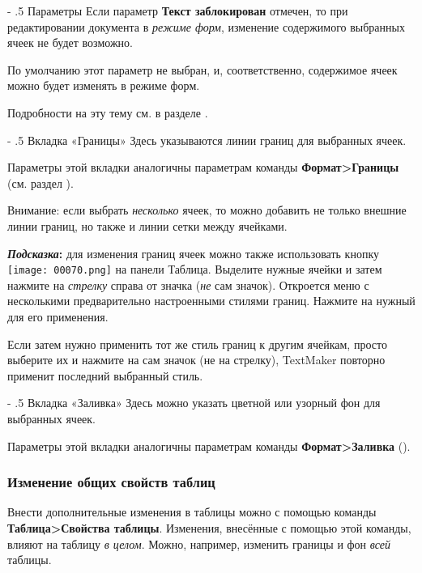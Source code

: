 ﻿\documentclass[a4paper,10pt]{article}
\makeatletter
\renewcommand\paragraph{%
   \@startsection{paragraph}{4}{0mm}%
      {-\baselineskip}%
      {.5\baselineskip}%
      {\normalfont\normalsize\bfseries}}
\makeatother
\begin{document}
\paragraph{Параметры}
Если параметр \textbf{Текст заблокирован} отмечен, то при редактировании документа в \textit{режиме форм}, изменение содержимого выбранных ячеек не будет возможно.

По умолчанию этот параметр не выбран, и, соответственно, содержимое ячеек можно будет изменять в режиме форм.

Подробности на эту тему см. в разделе .

\paragraph{Вкладка «Границы»}
Здесь указываются линии границ для выбранных ячеек.

Параметры этой вкладки аналогичны параметрам команды \textbf{Формат>Границы} (см. раздел ).

Внимание: если выбрать \textit{несколько} ячеек, то можно добавить не только внешние линии границ, но также и линии сетки между ячейками.

\begin{mdframed}[backgroundcolor=blue!10]
\textbf{\textit{Подсказка}:} для изменения границ ячеек можно также использовать кнопку \texttt{[image: 00070.png]} на панели Таблица. Выделите нужные ячейки и затем нажмите на \textit{стрелку} справа от значка (\textit{не} сам значок). Откроется меню с несколькими предварительно настроенными стилями границ. Нажмите на нужный для его применения.

Если затем нужно применить тот же стиль границ к другим ячейкам, просто выберите их и нажмите на сам значок (не на стрелку), TextMaker повторно применит последний выбранный стиль.
\end{mdframed}

\paragraph{Вкладка «Заливка»}
Здесь можно указать цветной или узорный фон для выбранных ячеек.

Параметры этой вкладки аналогичны параметрам команды \textbf{Формат>Заливка} ().

\subsubsection{Изменение общих свойств таблиц}
Внести дополнительные изменения в таблицы можно с помощью команды \textbf{Таблица>Свойства таблицы}. Изменения, внесённые с помощью этой команды, влияют на таблицу \textit{в целом}. Можно, например, изменить границы и фон \textit{всей} таблицы.
\end{document}
